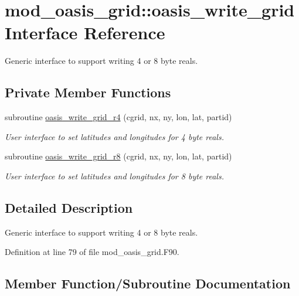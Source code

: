 \hypertarget{interfacemod__oasis__grid_1_1oasis__write__grid}{}\section{mod\+\_\+oasis\+\_\+grid\+:\+:oasis\+\_\+write\+\_\+grid Interface Reference}
\label{interfacemod__oasis__grid_1_1oasis__write__grid}


Generic interface to support writing 4 or 8 byte reals.  


\subsection*{Private Member Functions}
\begin{DoxyCompactItemize}
\item 
subroutine \hyperlink{interfacemod__oasis__grid_1_1oasis__write__grid_a7eede475150c0fa6692193c940d4268b}{oasis\+\_\+write\+\_\+grid\+\_\+r4} (cgrid, nx, ny, lon, lat, partid)
\begin{DoxyCompactList}\small\item\em User interface to set latitudes and longitudes for 4 byte reals. \end{DoxyCompactList}\item 
subroutine \hyperlink{interfacemod__oasis__grid_1_1oasis__write__grid_a31dbc6c9b5268a261b61a005762ffb28}{oasis\+\_\+write\+\_\+grid\+\_\+r8} (cgrid, nx, ny, lon, lat, partid)
\begin{DoxyCompactList}\small\item\em User interface to set latitudes and longitudes for 8 byte reals. \end{DoxyCompactList}\end{DoxyCompactItemize}


\subsection{Detailed Description}
Generic interface to support writing 4 or 8 byte reals. 

Definition at line 79 of file mod\+\_\+oasis\+\_\+grid.\+F90.



\subsection{Member Function/\+Subroutine Documentation}
\mbox{\label{interfacemod__oasis__grid_1_1oasis__write__grid_a7eede475150c0fa6692193c940d4268b}} 
